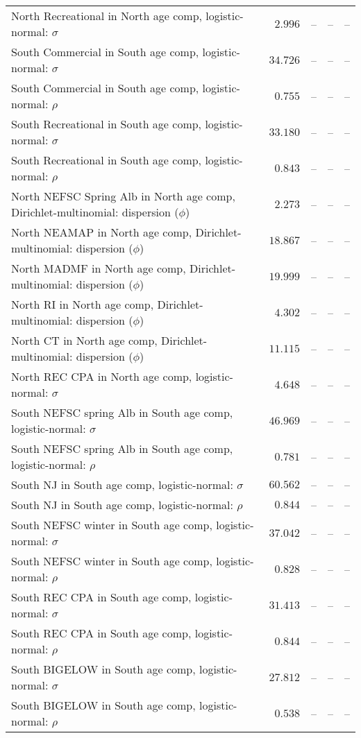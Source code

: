 \documentclass[
]{article}
\begin{document}
\begin{landscape}
\begin{longtable}[t]{lrrrr}
North Recreational in North age comp, logistic-normal: $\sigma$ & $2.996$ & -- & -- & --\\
\addlinespace
South Commercial in South age comp, logistic-normal: $\sigma$ & $34.726$ & -- & -- & --\\
South Commercial in South age comp, logistic-normal: $\rho$ & $0.755$ & -- & -- & --\\
South Recreational in South age comp, logistic-normal: $\sigma$ & $33.180$ & -- & -- & --\\
South Recreational in South age comp, logistic-normal: $\rho$ & $0.843$ & -- & -- & --\\
North NEFSC Spring Alb in North age comp, Dirichlet-multinomial: dispersion ($\phi$) & $2.273$ & -- & -- & --\\
\addlinespace
North NEAMAP in North age comp, Dirichlet-multinomial: dispersion ($\phi$) & $18.867$ & -- & -- & --\\
North MADMF in North age comp, Dirichlet-multinomial: dispersion ($\phi$) & $19.999$ & -- & -- & --\\
North RI in North age comp, Dirichlet-multinomial: dispersion ($\phi$) & $4.302$ & -- & -- & --\\
North CT in North age comp, Dirichlet-multinomial: dispersion ($\phi$) & $11.115$ & -- & -- & --\\
North REC CPA in North age comp, logistic-normal: $\sigma$ & $4.648$ & -- & -- & --\\
\addlinespace
South NEFSC spring Alb in South age comp, logistic-normal: $\sigma$ & $46.969$ & -- & -- & --\\
South NEFSC spring Alb in South age comp, logistic-normal: $\rho$ & $0.781$ & -- & -- & --\\
South NJ in South age comp, logistic-normal: $\sigma$ & $60.562$ & -- & -- & --\\
South NJ in South age comp, logistic-normal: $\rho$ & $0.844$ & -- & -- & --\\
South NEFSC winter in South age comp, logistic-normal: $\sigma$ & $37.042$ & -- & -- & --\\
\addlinespace
South NEFSC winter in South age comp, logistic-normal: $\rho$ & $0.828$ & -- & -- & --\\
South REC CPA in South age comp, logistic-normal: $\sigma$ & $31.413$ & -- & -- & --\\
South REC CPA in South age comp, logistic-normal: $\rho$ & $0.844$ & -- & -- & --\\
South BIGELOW in South age comp, logistic-normal: $\sigma$ & $27.812$ & -- & -- & --\\
South BIGELOW in South age comp, logistic-normal: $\rho$ & $0.538$ & -- & -- & --\\*
\end{longtable}
\end{landscape}
\end{document}
